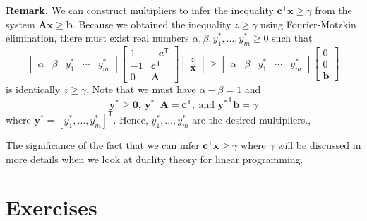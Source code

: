 \documentclass[]{book}
\newcommand{\T}{\mathsf{T}}
\newcommand{\mm}[1]{\mathbf{#1}}
\renewcommand{\vec}[1]{\mathbf{#1}}
\theoremstyle{definition}
\theoremstyle{definition}
\theoremstyle{remark}
\begin{document}
\textbf{Remark.} We can construct multipliers to infer the inequality
\(\vec{c}^\T \vec{x} \geq \gamma\) from the system
\(\mm{A}\vec{x} \geq \vec{b}\). Because we obtained the inequality
\(z \geq \gamma\) using Fourier-Motzkin elimination, there must exist
real numbers \(\alpha, \beta, y^*_1,\ldots, y^*_m\geq 0\) such that \[
\begin{bmatrix}\alpha & \beta & y^*_1 & \cdots &y^*_m\end{bmatrix}
\begin{bmatrix}
1 & -\vec{c}^\T  \\
-1 & \vec{c}^\T  \\
0 & \mm{A}
\end{bmatrix}
\begin{bmatrix} z \\ \vec{x} \end{bmatrix}
\geq
\begin{bmatrix}\alpha & \beta & y^*_1 & \cdots &y^*_m\end{bmatrix}
\begin{bmatrix} 0 \\ 0\\ \vec{b} \end{bmatrix}
\] is identically \(z \geq \gamma\). Note that we must have
\(\alpha-\beta = 1\) and
\[\mathbf{y}^* \geq \mathbf{0},~{\mathbf{y}^*}^\T \mm{A}
= \vec{c}^\T ,~\mbox{and }
{\mathbf{y}^*}^\T \vec{b} = \gamma\] where
\(\mathbf{y}^* = [y^*_1,\ldots,y^*_m]^\T \). Hence,
\(y^*_1,\ldots,y^*_m\) are the desired multipliers.,

The significance of the fact that we can infer
\(\vec{c}^\T \vec{x} \geq \gamma\) where \(\gamma\) will be discussed in
more details when we look at duality theory for linear programming.

\section*{Exercises}\label{exercises-5}
\end{document}
